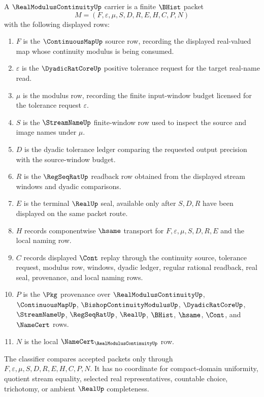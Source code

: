 \begin{definition}
\label{def:real-modulus-continuity-carrier}
A $\RealModulusContinuityUp$ carrier is a finite $\BHist$ packet
$$
M=(F,\varepsilon,\mu,S,D,R,E,H,C,P,N)
$$
with the following displayed rows:
\begin{enumerate}
\item $F$ is the $\ContinuousMapUp$ source row, recording the displayed real-valued map whose continuity modulus is being consumed.
\item $\varepsilon$ is the $\DyadicRatCoreUp$ positive tolerance request for the target real-name read.
\item $\mu$ is the modulus row, recording the finite input-window budget licensed for the tolerance request $\varepsilon$.
\item $S$ is the $\StreamNameUp$ finite-window row used to inspect the source and image names under $\mu$.
\item $D$ is the dyadic tolerance ledger comparing the requested output precision with the source-window budget.
\item $R$ is the $\RegSeqRatUp$ readback row obtained from the displayed stream windows and dyadic comparisons.
\item $E$ is the terminal $\RealUp$ seal, available only after $S,D,R$ have been displayed on the same packet route.
\item $H$ records componentwise $\hsame$ transport for $F,\varepsilon,\mu,S,D,R,E$ and the local naming row.
\item $C$ records displayed $\Cont$ replay through the continuity source, tolerance request, modulus row, windows, dyadic ledger, regular rational readback, real seal, provenance, and local naming rows.
\item $P$ is the $\Pkg$ provenance over $\RealModulusContinuityUp$, $\ContinuousMapUp$, $\BishopContinuityModulusUp$, $\DyadicRatCoreUp$, $\StreamNameUp$, $\RegSeqRatUp$, $\RealUp$, $\BHist$, $\hsame$, $\Cont$, and $\NameCert$ rows.
\item $N$ is the local $\NameCert_{\RealModulusContinuityUp}$ row.
\end{enumerate}
The classifier compares accepted packets only through $F,\varepsilon,\mu,S,D,R,E,H,C,P,N$. It has no coordinate for compact-domain uniformity, quotient stream equality, selected real representatives, countable choice, trichotomy, or ambient $\RealUp$ completeness.
\end{definition}

